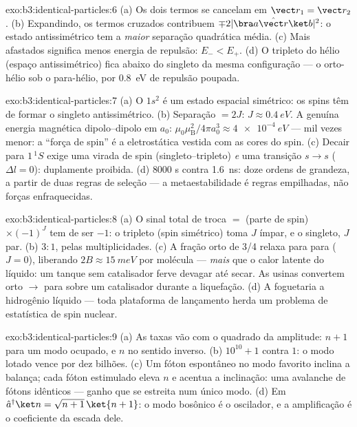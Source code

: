 \begin{solution}{exo:b3:identical-particles:6}
(a) Os dois termos se cancelam em $\vect r_1 = \vect r_2$. (b)
Expandindo, os termos cruzados contribuem
$\mp2|\bra a\hat{\vect r}\ket b|^2$: o estado antissimétrico tem a
\emph{maior} separação quadrática média. (c) Mais afastados significa
menos energia de repulsão: $E_- <
E_+$. (d) O tripleto do hélio (espaço
antissimétrico) fica abaixo do singleto da mesma configuração --- o
orto-hélio sob o para-hélio, por \qty{0.8}{eV} de repulsão poupada.
\end{solution}

\begin{solution}{exo:b3:identical-particles:7}
(a) O $1s^2$ é um estado espacial simétrico: os spins têm de formar o
singleto antissimétrico. (b) Separação $= 2J$: $J \approx
\qty{0.4}{eV}$. A genuína energia magnética dipolo--dipolo em $a_0$:
$\mu_0\mu_{\text{B}}^2/4\pi a_0^3 \approx \qty{4e-4}{eV}$ --- mil vezes
menor: a ``força de spin'' é a eletrostática vestida com as cores do
spin. (c) Decair para $1\,^1S$ exige uma virada de spin
(singleto--tripleto) \emph{e} uma transição $s \to s$ ($\Delta l =
0$): duplamente proibida. (d) $8000$ s contra \qty{1.6}{ns}: doze
ordens de grandeza, a partir de duas regras de seleção --- a
metaestabilidade é regras empilhadas, não forças enfraquecidas.
\end{solution}

\begin{solution}{exo:b3:identical-particles:8}
(a) O sinal total de troca $=$ (parte de spin) $\times (-1)^J$ tem de
ser $-1$: o tripleto (spin simétrico) toma $J$ ímpar, e o singleto, $J$
par. (b) $3:1$, pelas multiplicidades. (c) A fração orto de 3/4 relaxa
para para ($J = 0$), liberando $2B \approx \qty{15}{meV}$ por molécula
--- \emph{mais} que o calor latente do líquido: um tanque sem
catalisador ferve devagar até secar. As usinas convertem orto $\to$
para sobre um catalisador durante a liquefação. (d) A foguetaria a
hidrogênio líquido --- toda plataforma de lançamento herda um problema
de estatística de spin nuclear.
\end{solution}

\begin{solution}{exo:b3:identical-particles:9}
(a) As taxas vão com o quadrado da amplitude: $n + 1$ para um modo
ocupado, e $n$ no sentido inverso. (b) $10^{10} + 1$ contra $1$: o modo
lotado vence por dez bilhões. (c) Um fóton espontâneo no modo favorito
inclina a balança; cada fóton estimulado eleva $n$ e acentua a
inclinação: uma avalanche de fótons idênticos --- ganho que se estreita
num único modo. (d) Em $\hat a^\dagger\ket n =
\sqrt{n+1}\,\ket{n+1}$: o modo bosônico é o oscilador, e a amplificação
é o coeficiente da escada dele.
\end{solution}


